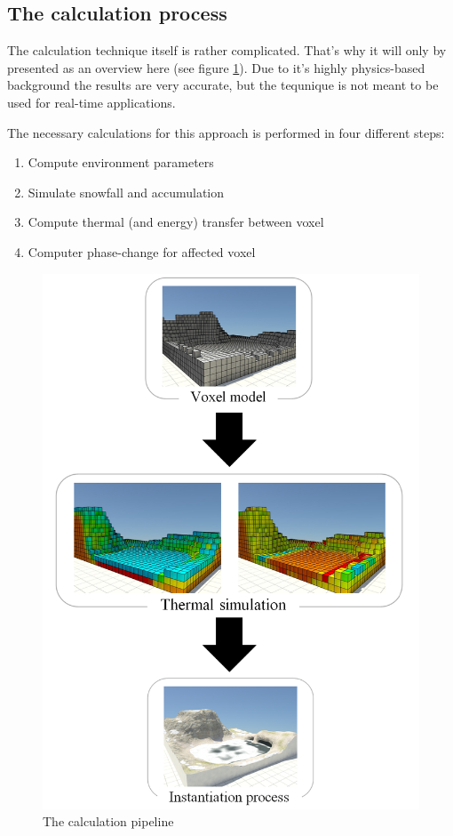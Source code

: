 \subsection{The calculation process}
The calculation technique itself is rather complicated. That's why it will only by presented as an overview here (see figure \ref{fig:calcpipeline}). Due to it's highly physics-based background the results are very accurate, but the tequnique is not meant to be used for real-time applications.

The necessary calculations for this approach is performed in four different steps:
\begin{enumerate}
	\item Compute environment parameters
	\item Simulate snowfall and accumulation
	\item Compute thermal (and energy) transfer between voxel
	\item Computer phase-change for affected voxel
\end{enumerate}

\begin{figure}[htb]
	\centering
	\includegraphics[width=\linewidth]{BF01/sem_heat2_merged.png}
	\caption{The calculation pipeline}
	\label{fig:calcpipeline}
\end{figure}

